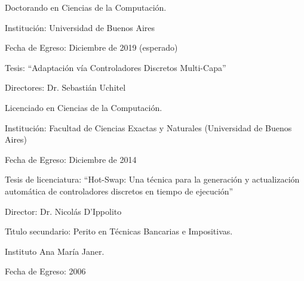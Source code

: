 \item Doctorando en Ciencias de la Computaci\'on.
    \begin{compactitem}[-]
        \item Instituci\'on: Universidad de Buenos Aires
        \item Fecha de Egreso: Diciembre de 2019 (esperado)
        \item Tesis: ``Adaptaci\'on v\'ia Controladores Discretos Multi-Capa''
        \item Directores: Dr. Sebasti\'an Uchitel
\end{compactitem}

\item Licenciado en Ciencias de la Computaci\'on.
    \begin{compactitem}[-]
        \item Instituci\'on: Facultad de Ciencias Exactas y Naturales
    (Universidad de Buenos Aires)
        \item Fecha de Egreso: Diciembre de 2014
        \item Tesis de licenciatura: ``Hot-Swap: Una t\'ecnica para la generaci\'on y actualizaci\'on autom\'atica de controladores discretos en tiempo de ejecuci\'on''
        \item Director: Dr. Nicol\'as D'Ippolito
\end{compactitem}

\item T\'{\i}tulo secundario: Perito en T\'ecnicas Bancarias e Impositivas.
    \begin{compactitem}[-]
    	\item Instituto Ana Mar\'ia Janer.
	\item Fecha de Egreso: 2006
    \end{compactitem}
